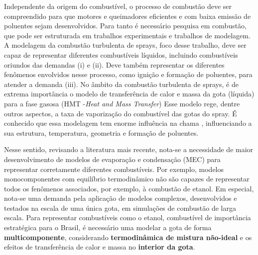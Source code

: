 Independente da origem do combustível, o processo de combustão deve ser compreendido para que motores e queimadores eficientes e com baixa emissão de poluentes sejam desenvolvidos.
Para tanto é necessário pesquisa em combustão, que pode ser estruturada em trabalhos experimentais e trabalhos de modelagem.
A modelagem da combustão turbulenta de sprays, foco desse trabalho, deve ser capaz de representar diferentes combustíveis líquidos, incluindo combustíveis oriundos das demandas (i) e (ii).
Deve também representar os diferentes fenômenos envolvidos nesse processo, como ignição e formação de poluentes, para atender a demanda (iii).
No âmbito da combustão turbulenta de sprays, é de extrema importância o modelo de transferência de calor e massa da gota (líquida) para a fase gasosa (HMT -\emph{Heat and Mass Transfer})
Esse modelo rege, dentre outros aspectos, a taxa de vaporização do combustível das gotas do spray.
É conhecido que essa modelagem tem enorme influência na chama \cite{JennyB2012}, influenciando a sua estrutura, temperatura, geometria e formação de poluentes.

Nesse sentido, revisando a literatura mais recente, nota-se a necessidade de maior desenvolvimento de modelos de evaporação e condensação (MEC) para representar corretamente diferentes combustíveis.
Por exemplo, modelos monocomponentes com equilíbrio termodinâmico não são capazes de representar todos os fenômenos associados, por exemplo, à combustão de etanol.
Em especial, nota-se uma demanda pela aplicação de modelos complexos, desenvolvidos e testados na escala de uma única gota, em simulações de combustão de larga escala.
Para representar combustíveis como o etanol, combustível de importância estratégica para o Brasil, é necessário uma modelar a gota de forma \textbf{multicomponente}, considerando \textbf{termodinâmica de mistura não-ideal} e os efeitos de transferência de calor e massa no \textbf{interior da gota}.

